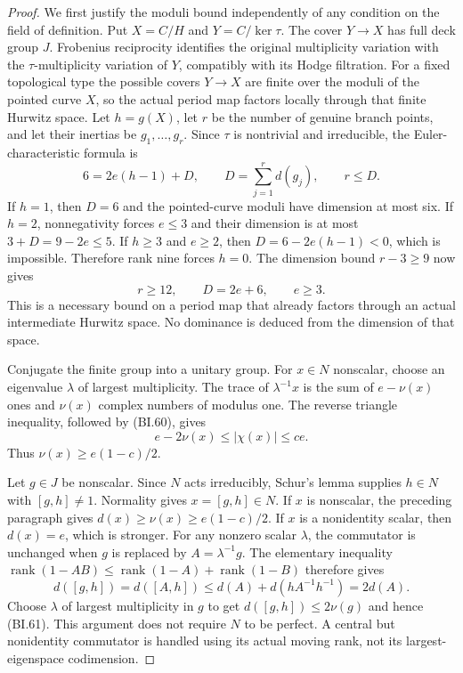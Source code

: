 \begin{proof}
We first justify the moduli bound independently of any condition on
the field of definition.  Put $X=C/H$ and $Y=C/\ker\tau$.  The cover
$Y\to X$ has full deck group $J$.  Frobenius reciprocity identifies
the original multiplicity variation with the $\tau$-multiplicity
variation of $Y$, compatibly with its Hodge filtration.  For a fixed
topological type the possible covers $Y\to X$ are finite over the
moduli of the pointed curve $X$, so the actual period map factors
locally through that finite Hurwitz space.  Let $h=g(X)$, let $r$ be
the number of genuine branch points, and let their inertias be
$g_1,\ldots,g_r$.  Since $\tau$ is nontrivial and irreducible, the
Euler-characteristic formula is
\[
       6=2e(h-1)+D,\qquad D=\sum_{j=1}^r d(g_j),\qquad r\le D.
                                                                  \tag{BI.65}
\]
If $h=1$, then $D=6$ and the pointed-curve moduli have dimension at
most six.  If $h=2$, nonnegativity forces $e\le3$ and their dimension
is at most $3+D=9-2e\le5$.  If $h\ge3$ and $e\ge2$, then
$D=6-2e(h-1)<0$, which is impossible.  Therefore rank nine forces
$h=0$.  The dimension bound $r-3\ge9$ now gives
\[
                         r\ge12,\qquad D=2e+6,
                         \qquad e\ge3.                       \tag{BI.66}
\]
This is a necessary bound on a period map that already factors
through an actual intermediate Hurwitz space.  No dominance is
deduced from the dimension of that space.

Conjugate the finite group into a unitary group.  For $x\in N$
nonscalar, choose an eigenvalue $\lambda$ of largest multiplicity.
The trace of $\lambda^{-1}x$ is the sum of $e-\nu(x)$ ones and
$\nu(x)$ complex numbers of modulus one.  The reverse triangle
inequality, followed by (BI.60), gives
\[
                    e-2\nu(x)\le|\chi(x)|\le ce.
\]
Thus $\nu(x)\ge e(1-c)/2$.

Let $g\in J$ be nonscalar.  Since $N$ acts irreducibly, Schur's
lemma supplies $h\in N$ with $[g,h]\ne1$.  Normality gives
$x=[g,h]\in N$.  If $x$ is nonscalar, the preceding paragraph gives
$d(x)\ge\nu(x)\ge e(1-c)/2$.  If $x$ is a nonidentity scalar,
then $d(x)=e$, which is stronger.  For any nonzero scalar $\lambda$,
the commutator is unchanged when $g$ is replaced by
$A=\lambda^{-1}g$.  The elementary inequality
$\operatorname{rank}(1-AB)\le\operatorname{rank}(1-A)
+\operatorname{rank}(1-B)$ therefore gives
\[
 d([g,h])=d([A,h])
 \le d(A)+d(hA^{-1}h^{-1})=2d(A).
\]
Choose $\lambda$ of largest multiplicity in $g$ to get
$d([g,h])\le2\nu(g)$ and hence (BI.61).  This argument does not
require $N$ to be perfect.  A central but nonidentity commutator is
handled using its actual moving rank, not its largest-eigenspace
codimension.


\end{proof}
